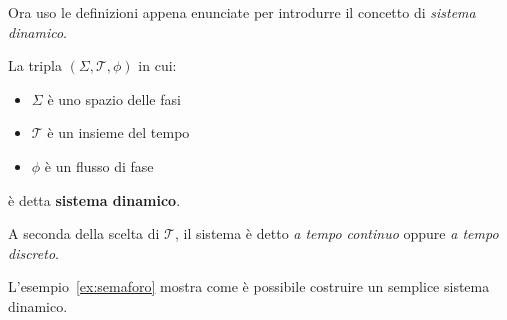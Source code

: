 Ora uso le definizioni appena enunciate per introdurre il concetto di
\emph{sistema dinamico}.

\begin{definition}
    La tripla $(\Sigma, \mathcal T, \phi)$ in cui:
    \begin{itemize}
        \item $\Sigma$ è uno spazio delle fasi%
        \item $\mathcal T$ è un insieme del tempo%
        \item $\phi$ è un flusso di fase%
    \end{itemize}
    è detta \textbf{sistema dinamico}.
    \label{def:sistema-dinamico}
\end{definition}

A seconda della scelta di $\mathcal T$, il sistema è detto
\emph{a tempo continuo} oppure \emph{a tempo discreto}.

L'esempio~\ref{ex:semaforo} mostra come è possibile costruire
un semplice sistema dinamico.

